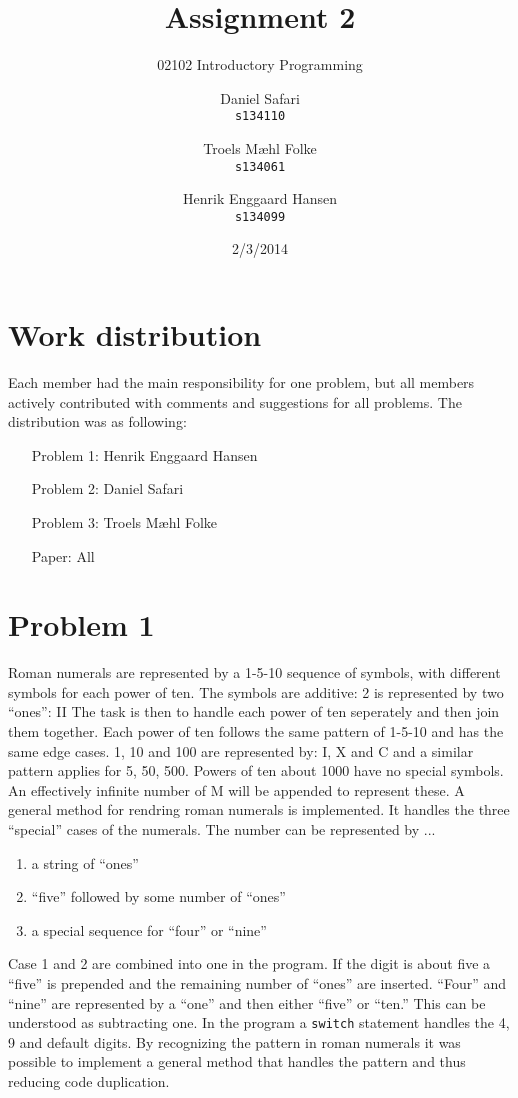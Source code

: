 \documentclass{scrartcl}
\newcommand\code[1]{\texttt{#1}}
\begin{document}

\title{Assignment 2}
\subtitle{02102 Introductory Programming}
\author{
  Daniel Safari\\
  \texttt{s134110}
  \and
  Troels Mæhl Folke\\
  \texttt{s134061}
   \and
  Henrik Enggaard Hansen\\
  \texttt{s134099}
}
\date{2/3/2014}
\maketitle
\thispagestyle{empty}
\setcounter{page}{0}
\null
\vfill
\section*{Work distribution}

Each member had the main responsibility for one problem, but all members
actively contributed with comments and suggestions for all problems. The
distribution was as following:
\begin{itemize}
\setlength{\itemindent}{3em}
\item[Problem 1:] Henrik Enggaard Hansen
\item[Problem 2:] Daniel Safari
\item[Problem 3:] Troels Mæhl Folke
\item[Paper:]  All
\end{itemize}
\newpage

\section*{Problem 1}

Roman numerals are represented by a 1-5-10 sequence of symbols, with different symbols for each power of ten. The symbols are additive: 2 is represented by two ``ones'': II
The task is then to handle each power of ten seperately and then join them together. Each power of ten follows the same pattern of 1-5-10 and has the same edge cases. 1, 10 and 100 are represented by: I, X and C and a similar pattern applies for 5, 50, 500.
Powers of ten about 1000 have no special symbols. An effectively infinite number of M will be appended to represent these.
A general method for rendring roman numerals is implemented. It handles the three ``special'' cases of the numerals. The number can be represented by ...
\begin{enumerate}
\item a string of ``ones''
\item ``five'' followed by some number of ``ones''
\item a special sequence for ``four'' or ``nine''
\end{enumerate}
Case 1 and 2 are combined into one in the program. If the digit is about five a ``five'' is prepended and the remaining number of ``ones'' are inserted. ``Four'' and ``nine'' are represented by a ``one'' and then either ``five'' or ``ten.'' This can be understood as subtracting one. In the program a \code{switch} statement handles the 4, 9 and default digits.
By recognizing the pattern in roman numerals it was possible to implement a general method that handles the pattern and thus reducing code duplication.
\end{document}
